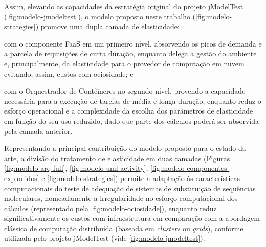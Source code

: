 \documentclass[english,brazilian]{UNISINOSmonografia} %
\begin{document}
Assim, elevando as capacidades da estratégia original do projeto jModelTest (\autoref{fig:modelo-jmodeltest}), o modelo proposto neste trabalho (\autoref{fig:modelo-strategies}) promove uma dupla camada de elasticidade:
\begin{inparaenum}[(i)]
	\item com o componente FaaS em um primeiro nível, absorvendo os picos de demanda e a parcela de requisições de curta duração, enquanto delega a gestão do ambiente e, principalmente, da elasticidade para o provedor de computação em nuvem evitando, assim, custos com ociosidade; e
	
	\item com o Orquestrador de Contêineres no segundo nível, provendo a capacidade necessária para a execução de tarefas de média e longa duração, enquanto reduz o esforço operacional e a complexidade da escolha dos parâmetros de elasticidade em função do seu uso reduzido, dado que parte dos cálculos poderá ser absorvida pela camada anterior.
\end{inparaenum}


Representando a principal contribuição do modelo proposto para o estado da arte, a divisão do tratamento de elasticidade em duas camadas (Figuras \ref{fig:modelo-arq-full}, \ref{fig:modelo-uml-activity}, \ref{fig:modelo-componentes-explodidos} e \ref{fig:modelo-strategies}) permite a adaptação às características computacionais do teste de adequação de sistemas de substituição de sequências moleculares, nomeadamente a irregularidade no esforço computacional dos cálculos (representado pela \autoref{fig:modelo-ociosidade}), enquanto reduz significativamente os custos com infraestrutura em comparação com a abordagem clássica de computação distribuída (baseada em \textit{clusters} ou \textit{grids}), conforme utilizada pelo projeto jModelTest (vide \autoref{fig:modelo-jmodeltest}).
\end{document}
